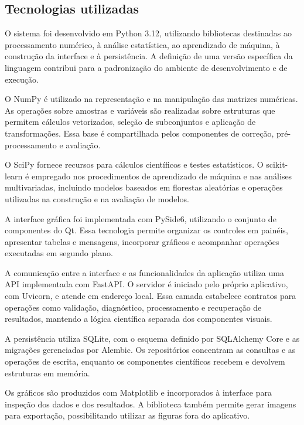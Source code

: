 \subsection{Tecnologias utilizadas}
\label{subsec:tecnologias-utilizadas}

O sistema foi desenvolvido em Python 3.12, utilizando bibliotecas destinadas ao processamento numérico, à análise estatística, ao aprendizado de máquina, à construção da interface e à persistência. A definição de uma versão específica da linguagem contribui para a padronização do ambiente de desenvolvimento e de execução.

O NumPy é utilizado na representação e na manipulação das matrizes numéricas. As operações sobre amostras e variáveis são realizadas sobre estruturas que permitem cálculos vetorizados, seleção de subconjuntos e aplicação de transformações. Essa base é compartilhada pelos componentes de correção, pré-processamento e avaliação.

O SciPy fornece recursos para cálculos científicos e testes estatísticos. O scikit-learn é empregado nos procedimentos de aprendizado de máquina e nas análises multivariadas, incluindo modelos baseados em florestas aleatórias e operações utilizadas na construção e na avaliação de modelos.

A interface gráfica foi implementada com PySide6, utilizando o conjunto de componentes do Qt. Essa tecnologia permite organizar os controles em painéis, apresentar tabelas e mensagens, incorporar gráficos e acompanhar operações executadas em segundo plano.

A comunicação entre a interface e as funcionalidades da aplicação utiliza uma API implementada com FastAPI. O servidor é iniciado pelo próprio aplicativo, com Uvicorn, e atende em endereço local. Essa camada estabelece contratos para operações como validação, diagnóstico, processamento e recuperação de resultados, mantendo a lógica científica separada dos componentes visuais.

A persistência utiliza SQLite, com o esquema definido por SQLAlchemy Core e as migrações gerenciadas por Alembic. Os repositórios concentram as consultas e as operações de escrita, enquanto os componentes científicos recebem e devolvem estruturas em memória.

Os gráficos são produzidos com Matplotlib e incorporados à interface para inspeção dos dados e dos resultados. A biblioteca também permite gerar imagens para exportação, possibilitando utilizar as figuras fora do aplicativo.

